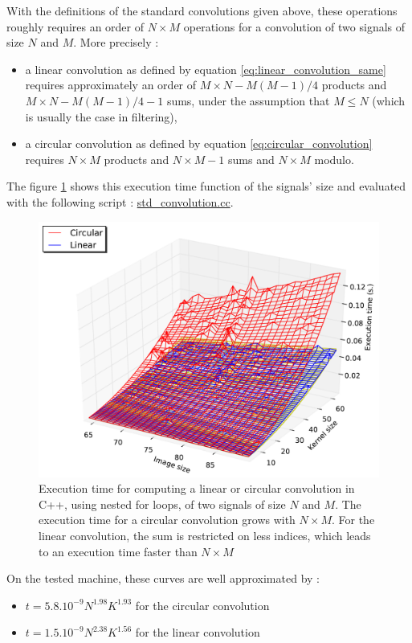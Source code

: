 \documentclass[a4paper,10pt,twoside]{article}
\begin{document}
With the definitions of the standard convolutions given above, these operations roughly requires an order of $N\times M$ operations for a convolution of two signals of size $N$ and $M$. More precisely :
\begin{itemize}
\item a linear convolution as defined by equation \ref{eq:linear_convolution_same} requires approximately an order of $M\times N - M(M-1)/4$ products and $M\times N - M(M-1)/4 -1$ sums, under the assumption that $M \leq N$ (which is usually the case in filtering),
\item a circular convolution as defined by equation \ref{eq:circular_convolution} requires $N\times M$ products and $N\times M-1$ sums and $N\times M$ modulo.
\end{itemize}
The figure \ref{fig:benchmark_std_convolution.pdf} shows this execution time function of the signals' size and evaluated with the following script : \href{http://jeremy.fix.free.fr/Software/Convolution/std_convolution.cc}{std\_convolution.cc}.
\begin{figure}[htbp]
\center \includegraphics[width=0.5\linewidth]{../Images/benchmark_std_convolution.pdf}
\caption{\label{fig:benchmark_std_convolution.pdf} Execution time for computing a linear or circular convolution in C++, using nested for loops, of two signals of size $N$ and $M$. The execution time for a circular convolution grows with $N \times M$. For the linear convolution, the sum is restricted on less indices, which leads to an execution time faster than $N \times M$}
\end{figure}

On the tested machine, these curves are well approximated by :
\begin{itemize}
\item $t = 5.8.10^{-9} N^{1.98} K^{1.93}$ for the circular convolution
\item $t = 1.5.10^{-9} N^{2.38} K^{1.56}$ for the linear convolution
\end{itemize}
\end{document}

